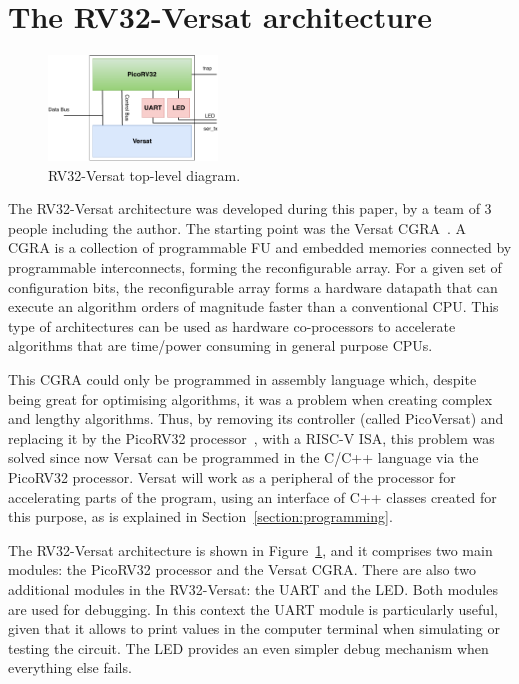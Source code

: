 \documentclass[conference]{IEEEtran}
\begin{document}

\section{The RV32-Versat architecture}
\label{chapter:rv32-versat}

\begin{figure}[!htb]
	\centering
	\includegraphics[width=0.4\textwidth]{Figures/rv32-versat.pdf}
	\caption{RV32-Versat top-level diagram.}
	\label{fig:rv32-versat}
\end{figure}

The RV32-Versat architecture was developed during this paper, by a team of 3
people including the author. The starting point was the Versat
\ac{CGRA}~\cite{sousa:versat, sousa:versat2016, sousa:controller,
	sousa:compiler, versat:specification}. A \acf{CGRA} is a collection of programmable 
\ac{FU} and embedded memories connected by programmable interconnects, forming the 
reconfigurable array. For a given set of configuration bits, the reconfigurable
array forms a hardware datapath that can execute an algorithm orders of magnitude faster 
than a conventional \ac{CPU}. This type of architectures can be used as hardware 
co-processors to accelerate algorithms that are time/power consuming in general purpose 
\ac{CPU}s.

This \ac{CGRA} could only be programmed
in assembly language which, despite being great for optimising algorithms, it
was a problem when creating complex and lengthy algorithms. Thus, by removing
its controller (called PicoVersat) and replacing it by the PicoRV32
processor~\cite{cliffordwolf:picorv32}, with a RISC-V \ac{ISA}, this problem was
solved since now Versat can be programmed in the C/C++ language via the PicoRV32
processor. Versat will work as a peripheral of the processor for accelerating
parts of the program, using an interface of C++ classes created for this
purpose, as is explained in Section~\ref{section:programming}.

The RV32-Versat architecture is shown in Figure~\ref{fig:rv32-versat}, and it
comprises two main modules: the PicoRV32 processor and the Versat \ac{CGRA}.
There are also two additional modules in the RV32-Versat: the \ac{UART} and the
\ac{LED}.  Both modules are used for debugging. In this context the \ac{UART}
module is particularly useful, given that it allows to print values in the
computer terminal when simulating or testing the circuit. The LED provides an
even simpler debug mechanism when everything else fails.
\end{document}
